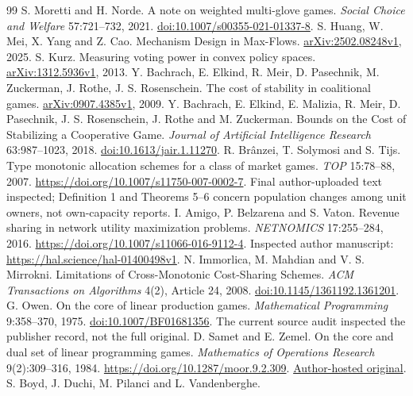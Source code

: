 \documentclass[11pt]{article}
\theoremstyle{definition}\newtheorem{definition}[theorem]{Definition}
\theoremstyle{remark}\newtheorem{remark}[theorem]{Remark}
\begin{document}
\begin{thebibliography}{99}
S. Moretti and H. Norde.
A note on weighted multi-glove games.
\emph{Social Choice and Welfare} 57:721--732, 2021.
\href{https://doi.org/10.1007/s00355-021-01337-8}{doi:10.1007/s00355-021-01337-8}.
S. Huang, W. Mei, X. Yang and Z. Cao.
Mechanism Design in Max-Flows.
\href{https://arxiv.org/abs/2502.08248}{arXiv:2502.08248v1}, 2025.
S. Kurz. Measuring voting power in convex policy spaces.
\href{https://arxiv.org/abs/1312.5936}{arXiv:1312.5936v1}, 2013.
Y. Bachrach, E. Elkind, R. Meir, D. Pasechnik, M. Zuckerman, J. Rothe,
J. S. Rosenschein.
The cost of stability in coalitional games.
\href{https://arxiv.org/abs/0907.4385v1}{arXiv:0907.4385v1}, 2009.
Y. Bachrach, E. Elkind, E. Malizia, R. Meir, D. Pasechnik,
J. S. Rosenschein, J. Rothe and M. Zuckerman.
Bounds on the Cost of Stabilizing a Cooperative Game.
\emph{Journal of Artificial Intelligence Research} 63:987--1023, 2018.
\href{https://doi.org/10.1613/jair.1.11270}{doi:10.1613/jair.1.11270}.
R. Br\^anzei, T. Solymosi and S. Tijs.
Type monotonic allocation schemes for a class of market games.
\emph{TOP} 15:78--88, 2007.
\url{https://doi.org/10.1007/s11750-007-0002-7}.
Final author-uploaded text inspected; Definition 1 and Theorems 5--6 concern
population changes among unit owners, not own-capacity reports.
I. Amigo, P. Belzarena and S. Vaton.
Revenue sharing in network utility maximization problems.
\emph{NETNOMICS} 17:255--284, 2016.
\url{https://doi.org/10.1007/s11066-016-9112-4}.
Inspected author manuscript: \url{https://hal.science/hal-01400498v1}.
N. Immorlica, M. Mahdian and V. S. Mirrokni.
Limitations of Cross-Monotonic Cost-Sharing Schemes.
\emph{ACM Transactions on Algorithms} 4(2), Article 24, 2008.
\href{https://doi.org/10.1145/1361192.1361201}{doi:10.1145/1361192.1361201}.
G. Owen. On the core of linear production games.
\emph{Mathematical Programming} 9:358--370, 1975.
\href{https://doi.org/10.1007/BF01681356}{doi:10.1007/BF01681356}.
The current source audit inspected the publisher record, not the full original.
D. Samet and E. Zemel. On the core and dual set of linear programming games.
\emph{Mathematics of Operations Research} 9(2):309--316, 1984.
\url{https://doi.org/10.1287/moor.9.2.309}.
\href{https://www.tau.ac.il/~samet/papers/lp\%20games.pdf}{Author-hosted original}.
S. Boyd, J. Duchi, M. Pilanci and L. Vandenberghe.

\end{thebibliography}
\end{document}
